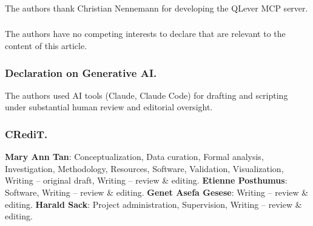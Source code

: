 \documentclass[runningheads]{llncs}
\begin{document}
\begin{credits}
\subsubsection{\ackname} The authors thank Christian Nennemann for developing the QLever MCP server.

\subsubsection{\discintname}
The authors have no competing interests to declare that are relevant to the content of this article.

\subsubsection*{Declaration on Generative AI.}
The authors used AI tools (Claude, Claude Code) for drafting and scripting under substantial human review and editorial oversight.

\subsubsection*{CRediT.}
\textbf{Mary Ann Tan}: Conceptualization, Data curation, Formal analysis, Investigation, Methodology, Resources, Software, Validation, Visualization, Writing -- original draft, Writing -- review \& editing.
\textbf{Etienne Posthumus}: Software, Writing -- review \& editing.
\textbf{Genet Asefa Gesese}: Writing -- review \& editing.
\textbf{Harald Sack}: Project administration, Supervision, Writing -- review \& editing.
\end{credits}
%
%
%


\end{document}
